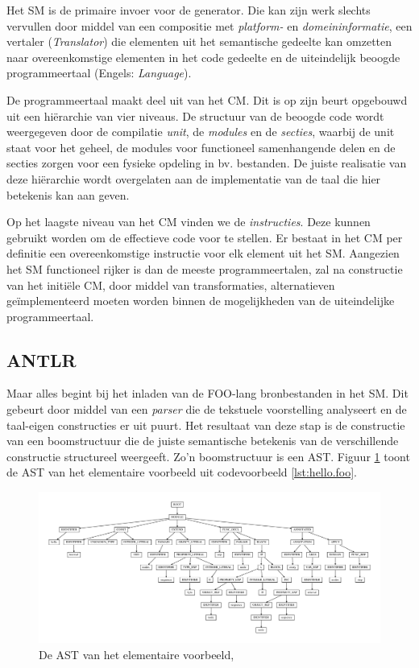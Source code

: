 Het SM is de primaire invoer voor de generator. Die kan zijn werk slechts
vervullen door middel van een compositie met \emph{platform-} en
\emph{domeininformatie}, een vertaler (\emph{Translator}) die elementen
uit het semantische gedeelte kan omzetten naar overeenkomstige elementen in het
code gedeelte en de uiteindelijk beoogde programmeertaal (Engels:
\emph{Language}).

De programmeertaal maakt deel uit van het CM. Dit is op zijn beurt opgebouwd
uit een hi\"erarchie van vier niveaus. De structuur van de beoogde code wordt
weergegeven door de compilatie \emph{unit}, de \emph{modules} en de
\emph{secties}, waarbij de unit staat voor het geheel, de modules voor
functioneel samenhangende delen en de secties zorgen voor een fysieke opdeling
in bv. bestanden. De juiste realisatie van deze hi\"erarchie wordt overgelaten
aan de implementatie van de taal die hier betekenis kan aan geven.

Op het laagste niveau van het CM vinden we de \emph{instructies}. Deze kunnen
gebruikt worden om de effectieve code voor te stellen. Er bestaat in het CM per
definitie een overeenkomstige instructie voor elk element uit het SM. Aangezien
het SM functioneel rijker is dan de meeste programmeertalen, zal na constructie
van het initi\"ele CM, door middel van transformaties, alternatieven
ge\"implementeerd moeten worden binnen de mogelijkheden van de uiteindelijke
programmeertaal.

\subsection{ANTLR}
\label{subsection:devel-antlr}

Maar alles begint bij het inladen van de FOO-lang bronbestanden in het SM. Dit
gebeurt door middel van een \emph{parser} die de tekstuele voorstelling
analyseert en de taal-eigen constructies er uit puurt. Het resultaat van deze
stap is de constructie van een boomstructuur die de juiste semantische
betekenis van de verschillende constructie structureel weergeeft. Zo'n
boomstructuur is een AST. Figuur \ref{fig:devel-ast} toont de AST van het
elementaire voorbeeld uit codevoorbeeld \ref{lst:hello.foo}.

\begin{figure}[ht]
  \centering
  \includegraphics[width=\linewidth]{resources/hello_ast.pdf}
  \caption{De AST van het elementaire voorbeeld, }
  \label{fig:devel-ast}
\end{figure}


